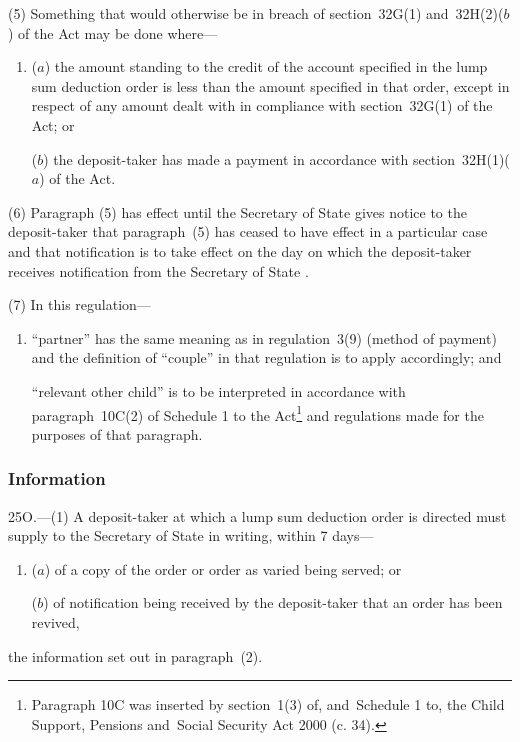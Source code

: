 \documentclass[12pt,a4paper]{article}
\begin{document}
(5) Something that would otherwise be in breach of section~32G(1) and~32H(2)($b$)  of the Act may be done where—
\begin{enumerate}\item[]
($a$) the amount standing to the credit of the account specified in the lump sum deduction order is less than the amount specified in that order, except in respect of any amount dealt with in compliance with section~32G(1) of the Act; or

($b$) the deposit-taker has made a payment in accordance with section~32H(1)($a$)  of the Act.
\end{enumerate}

(6) Paragraph (5) has effect until the 
Secretary of State  %
gives notice to the deposit-taker that paragraph~(5) has ceased to have effect in a particular case and that notification is to take effect on the day on which the deposit-taker receives notification from the 
Secretary of State%
.

(7) In this regulation—
\begin{enumerate}\item[]
\begin{sloppypar}
“partner” has the same meaning as in regulation~3(9) (method of payment) and the definition of “couple” in that regulation is to apply accordingly; and
\end{sloppypar}

“relevant other child” is to be interpreted in accordance with paragraph~10C(2) of Schedule 1 to the Act\footnote{Paragraph 10C was inserted by section~1(3) of, and~Schedule 1 to, the Child Support, Pensions and~Social Security Act 2000 (c. 34).} and regulations made for the purposes of that paragraph.
\end{enumerate}


\subsubsection[25O. Information]{Information}

25O.---(1)  A deposit-taker at which a lump sum deduction order is directed must supply to the 
Secretary of State  %
in writing, within 7 days—
\begin{enumerate}\item[]
($a$) of a copy of the order or order as varied being served; or

($b$) of notification being received by the deposit-taker that an order has been revived,
\end{enumerate}
the information set out in paragraph~(2).
\end{document}
